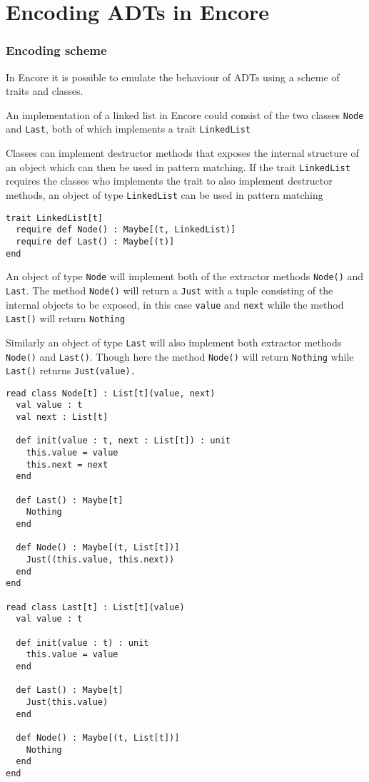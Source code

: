 \documentclass[10pt]{report}
\begin{document}
\chapter{Encoding ADTs in Encore}
\subsection{Encoding scheme}
\par{\noindent In Encore it is possible to emulate the behaviour of ADTs using a scheme of traits and classes.}\cite{gustavL}%
\par{\noindent An implementation of a linked list in Encore could consist of the two classes \texttt{Node} and \texttt{Last}, both of which implements a trait \texttt{LinkedList}\\}
\par{\noindent Classes can implement destructor methods that exposes the internal structure of an object which can then be used in pattern matching. If the trait \texttt{LinkedList} requires the classes who implements the trait to also implement destructor methods, an object of type \texttt{LinkedList} can be used in pattern matching}

\begin{lstlisting}[language=encore,caption={trait LinkedList that requires classes to implement destructor methods}]
trait LinkedList[t]
  require def Node() : Maybe[(t, LinkedList)]
  require def Last() : Maybe[(t)]
end
\end{lstlisting}
\par{\noindent An object of type \texttt{Node} will implement both of the extractor methods \texttt{Node()} and \texttt{Last}. The method \texttt{Node()} will return a \texttt{Just} with a tuple consisting of the internal objects to be exposed, in this case \texttt{value} and \texttt{next} while the method \texttt{Last()} will return \texttt{Nothing}}

\par{\noindent Similarly an object of type \texttt{Last} will also implement both extractor methods \texttt{Node()} and \texttt{Last()}. Though here the method \texttt{Node()} will return \texttt{Nothing} while \texttt{Last()} returns \texttt{Just(value).}}


\begin{lstlisting}[language=encore,caption={Implementation of Node and Last classes}]
read class Node[t] : List[t](value, next)
  val value : t
  val next : List[t]

  def init(value : t, next : List[t]) : unit
    this.value = value
    this.next = next
  end

  def Last() : Maybe[t]
    Nothing
  end

  def Node() : Maybe[(t, List[t])]
    Just((this.value, this.next))
  end
end

read class Last[t] : List[t](value)
  val value : t

  def init(value : t) : unit
    this.value = value
  end

  def Last() : Maybe[t]
    Just(this.value)
  end

  def Node() : Maybe[(t, List[t])]
    Nothing
  end
end
\end{lstlisting}
\end{document}
